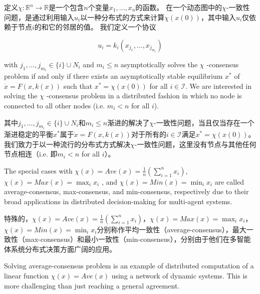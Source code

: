 \documentclass{article}
\begin{document}
定义$\chi: \mathbb{R}^n \rightarrow \mathbb{R}$是一个包含$n$个变量$x_1,\dots,x_n$的函数。
在一个动态图中的$\chi$-一致性问题，是通过利用输入$u_i$以一种分布式的方式来计算$\chi(x(0))$，其中输入$u_i$仅依赖于节点$i$的和它的邻居的值。
我们定义一个协议

\begin{equation}
    u_i = k_i(x_{j_1},\dots,x_{j_{m_i}})
    \tag{3}
    \label{3}
\end{equation}

{\color[gray]{0.5}
\noindent with $j_1,\dots,j_{m_i}\in \{i\} \cup N_i$ and $m_i\leq n$ asymptotically solves the $\chi$ -consensus problem if and only if there exists an asymptotically stable equilibrium $x^*$ of $\dot{x}=F(x,k(x))$ such that $x^*=\chi(x(0))$ for all $i\in \mathcal{I}$. 
We are interested in solving the $\chi$ -consensus problem in a distributed fashion in which {\color{green}no node is connected to all other nodes (i.e. $m_i < n$ for all $i$)}.
}

\noindent 其中$j_1,\dots,j_{m_i}\in \{i\} \cup N_i$和$m_i\leq n$渐进的解决了$\chi$-一致性问题，当且仅当存在一个渐进稳定的平衡$x^*$属于$\dot{x}=F(x,k(x))$对于所有的$i\in \mathcal{I}$满足$x^*=\chi(x(0))$。
我们致力于以一种流行的分布式方式解决$\chi$-一致性问题，这里没有节点与其他任何节点相连（i.e. 即$m_i < n$ for all $i$）。

{\color[gray]{0.5}
The special cases with $\chi(x)=Ave(x)=\frac{1}{n}(\sum_{i=1}^{n}x_i)$, $\chi(x)=Max(x)=\max_ix_i$ , and $\chi(x)=Min(x)=\min_ix_i$ are called average-consensus, max-consensus, and min-consensus, respectively due to their broad applications in distributed decision-making for multi-agent systems.
}

特殊的，$\chi(x)=Ave(x)=\frac{1}{n}(\sum_{i=1}^{n}x_i)$，$\chi(x)=Max(x)=\max_ix_i$，$\chi(x)=Min(x)=\min_ix_i$分别称作平均一致性（average-consensus），最大一致性（max-consensus）和最小一致性（min-consensus），分别由于他们在多智能体系统分布式决策方面广阔的应用。



{\color[gray]{0.5}
Solving average-consensus problem is an example of distributed computation of a linear function $\chi(x)=Ave(x)$ using a network of dynamic systems. 
This is more challenging than just reaching a general agreement.
}
\end{document}

